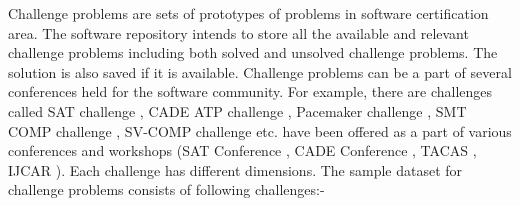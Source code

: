 \documentclass[11pt,letterpaper]{report}
\begin{document}
Challenge problems are sets of prototypes of problems in software certification area. The software repository intends to store all the available and relevant challenge problems including both solved and unsolved challenge problems. The solution is also saved if it is available. Challenge problems can be a part of several conferences held for the software community. For example, there are challenges called SAT challenge \cite{SAT}, CADE ATP  challenge \cite{CADE}, Pacemaker challenge \cite{Pacemaker}, SMT COMP challenge \cite{SMT}, SV-COMP challenge \cite{SV} etc. have been offered as a part of various conferences and workshops (SAT Conference \cite{SATEvent}, CADE Conference \cite{CADEConference}, TACAS \cite{TACAS}, IJCAR \cite{IJCAR}). Each challenge has different dimensions. The sample dataset for challenge problems consists of following challenges:- 
\end{document}
